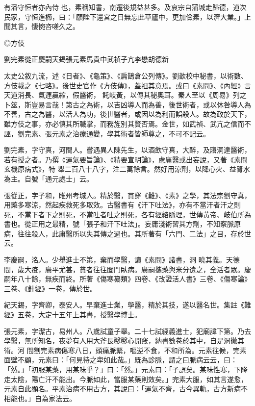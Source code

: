 \begin{pinyinscope}
 有潘守恒者亦內侍
 也，素稱知書，南遷後規益甚多。及哀宗自蒲城走歸德，道次民家，守恒進櫛，曰：「願陛下還宮之日無忘此草廬中，更加儉素，以濟大業。」上聞其言，悽惋咨嗟久之。



 ◎方伎



 劉完素從正慶嗣天錫張元素馬貴中武禎子亢李懋胡德新



 太史公敘九流，述《日者》、《龜策》、《扁鵲倉公列傳》。劉歆校中秘書，以術數、方伎載之《七略》。後世史官作《方伎傳》，蓋祖其意焉。或曰《素問》、《內經》言天道消長、氣運贏縮，假醫術，
 託岐黃，以傳其秘奧耳。秦人至以《周易》列之卜筮，斯豈易言哉！第古之為術，以吉凶導人而為善，後世術者，或以休咎導人為不善，古之為醫，以活人為功，後世醫者，或因以為利而誤殺人。故為政於天下，雖方伎之事，亦必慎其所職掌，而務旌別其賢否焉。金世，如武禎、武亢之信而不誣，劉完素、張元素之治療通變，學其術者皆師尊之，不可不記云。



 劉完素，字守真，河間人。嘗遇異人陳先生，以酒飲守真，大醉，及寤洞達醫術，若有授之者。乃撰《運氣要旨論》、《精要宣明論》，慮庸醫或出妄說，又著《素問玄機原病式》，特
 舉二百八十八字，注二萬餘言。然好用涼劑，以降心火、益腎水為主。自號「通元處士」云。



 張從正，字子和，睢州考城人。精於醫，貫穿《難》、《素》之學，其法宗劉守真，用藥多寒涼，然起疾救死多取效。古醫書有《汗下吐法》，亦有不當汗者汗之則死，不當下者下之則死，不當吐者吐之則死，各有經絡脈理，世傳黃帝、岐伯所為書也。從正用之最精，號「張子和汗下吐法」。妄庸淺術習其方劑，不知察脈原病，往往殺人，此庸醫所以失其傳之過也。其所著有「六門、二法」之目，存於世云。



 李慶嗣，洺人。少舉進士不第，棄而學醫，讀《素問》諸書，洞
 曉其義。天德間，歲大疫，廣平尤甚，貧者往往闔門臥病。廣嗣攜藥與米分遺之，全活者眾。慶嗣年八十餘，無疾而終。所著《傷寒纂類》四卷、《改證活人書》三卷、《傷寒論》三卷、《針經》一卷，傳於世。



 紀天錫，字齊卿，泰安人。早棄進士業，學醫，精於其技，遂以醫名世。集註《難經》五卷，大定十五年上其書，授醫學博士。



 張元素，字潔古，易州人。八歲試童子舉。二十七試經義進士，犯廟諱下第。乃去學醫，無所知名，夜夢有人用大斧長鑿鑿心開竅，納書數卷於其中，自是洞徹其術。河
 間劉完素病傷寒八日，頭痛脈緊，嘔逆不食，不和所為。元素往候，完素面壁不顧，元素曰：「何見待之卑如此哉。」既為診脈，謂之曰脈病云云，曰：「然。」「初服某藥，用某味乎？」曰：「然。」元素曰：「子誤矣。某味性寒，下降走太陰，陽亡汗不能出。今脈如此，當服某藥則效矣。」完素大服，如其言遂愈，元素自此顯名。平素治病不用古方，其說曰：「運氣不齊，古今異軌，古方新病不相能也。」自為家法云。




\end{pinyinscope}
